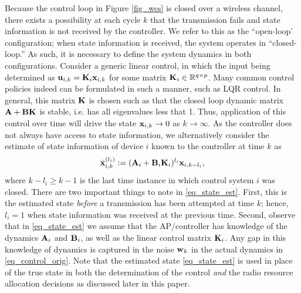Because the control loop in Figure \ref{fig_wcs} is closed over a wireless channel, there exists a possibility at each cycle $k$ that the transmission fails and state information is not received by the controller. We refer to this as the ``open-loop' configuration; when state information is received, the system operates in ``closed-loop.'' As such, it is necessary to define the system dynamics in both configurations. Consider a generic linear control, in which the input being determined as $ {\mathbf u}_{i,k} = {\mathbf K}_i {\mathbf x}_{i,k}$ for some matrix ${\mathbf K}_i \in {\mathbb R}^{q \times p}$. Many common control policies indeed can be formulated in such a manner, such as LQR control. In general, this matrix ${\mathbf K}$ is chosen such as that the closed loop dynamic matrix ${\mathbf A} + {\mathbf B} {\mathbf K}$ is stable, i.e. has all eigenvalues less that 1. Thus, application of this control over time will drive the state ${\mathbf x}_{i,k} \rightarrow 0$ as $k \rightarrow \infty$. As the controller does not always have access to state information, we alternatively consider the estimate of state information of device $i$ known to the controller at time $k$ as
%
\begin{align}\label{eq_state_est}
\hbx^{(l_i)}_{i,k} :=(\bbA_i + \bbB_i\bbK_i)^{l_i} \bbx_{i,k-l_i},
\end{align}
%
where $k-l_i \geq k-1$ is the last time instance in which control system $i$ was closed. There are two important things to note in \eqref{eq_state_est}. First, this is the estimated state \emph{before} a transmission has been attempted at time $k$; hence, $l_i = 1$ when state information was received at the previous time. Second, observe that in \eqref{eq_state_est} we assume that the AP/controller has knowledge of the dynamics ${\mathbf A}_i$ and ${\mathbf B}_i$, as well as the linear control matrix ${\mathbf K}_i$. Any gap in this knowledge of dynamics is captured in the noise ${\mathbf w}_k$ in the actual dynamics in \eqref{eq_control_orig}. Note that the estimated state \eqref{eq_state_est} is used in place of the true state in both the determination of the control \emph{and} the radio resource allocation decisions as discussed later in this paper.

